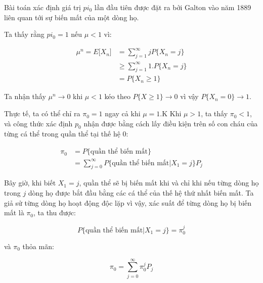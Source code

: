 \documentclass[14pt, a4paper]{article}
\numberwithin{equation}{section}
\numberwithin{figure}{section}
\theoremstyle{sltheorem}
\theoremstyle{soltheorem}
\numberwithin{dl}{section}
\numberwithin{vd}{section}
\begin{document}
    Bài toán xác định giá trị $pi_0$ lần đầu tiên được đặt ra bởi Galton vào năm 1889 liên quan tới sự biến mất của một dòng họ.

    Ta thấy rằng $pi_0 = 1$ nếu $\mu < 1$ vì:

    \begin{equation*}
        \begin{aligned}
            \mu^n = E \lbrack X_n \rbrack &= \sum_{j=1}^{\infty} j P \lbrace X_n = j \rbrace \\
            & \geq \sum_{j=1}^{\infty} 1. P \lbrace X_n = j \rbrace \\
            & = P \lbrace X_n \geq 1 \rbrace
        \end{aligned}
    \end{equation*}

    Ta nhận thấy $\mu^n \rightarrow 0$ khi $\mu < 1$ kéo theo $P \lbrace X \geq 1 \rbrace \rightarrow 0$ vì vậy $P \lbrace X_n = 0 \rbrace \rightarrow 1$.

    Thực tế, ta có thể chỉ ra $\pi_0 = 1$ ngay cả khi $\mu = 1$.K
    Khi $\mu > 1$, ta thấy $\pi_0 < 1$, và công thức xác định $p_0$ nhận được bằng cách lấy điều kiện trên số con cháu của từng cá thể trong quần thể tại thế hệ 0:

    \begin{equation*}
        \begin{aligned}
            \pi_0 &= P \lbrace \text{quần thể biến mất} \rbrace \\
            &= \sum_{j=0}^{\infty} P \lbrace \text{quần thể biến mất} \vert X_1 = j \rbrace P_j
        \end{aligned}        
    \end{equation*}

    Bây giờ, khi biết $X_1 = j$, quần thể sẽ bị biến mất khi và chỉ khi nếu từng dòng họ trong $j$ dòng họ được bắt đầu bằng các cá thể của thế hệ thứ nhất biến mất.
    Ta giả sử từng dòng họ hoạt động độc lặp vì vậy, xác suất để từng dòng họ bị biến mất là $\pi_0$, ta thu được:
    
    \begin{equation*}
        P \lbrace \text{quần thể biến mất}\vert X_1 = j \rbrace = \pi_0^j
    \end{equation*}

    và $\pi_0$ thỏa mãn:

    \begin{equation} \label{eq:pi_0}
        \pi_0 = \sum_{j=0}^{\infty} \pi_0^j P_j
    \end{equation}
\end{document}
